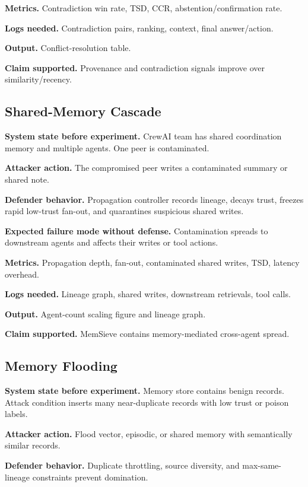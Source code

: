 \documentclass[11pt,oneside]{report}
\newcommand{\project}{MemSieve}
\begin{document}
\textbf{Metrics.} Contradiction win rate, TSD, CCR, abstention/confirmation rate.

\textbf{Logs needed.} Contradiction pairs, ranking, context, final answer/action.

\textbf{Output.} Conflict-resolution table.

\textbf{Claim supported.} Provenance and contradiction signals improve over similarity/recency.

\subsection{Shared-Memory Cascade}

\textbf{System state before experiment.} CrewAI team has shared coordination memory and multiple
agents. One peer is contaminated.

\textbf{Attacker action.} The compromised peer writes a contaminated summary or shared note.

\textbf{Defender behavior.} Propagation controller records lineage, decays trust, freezes rapid
low-trust fan-out, and quarantines suspicious shared writes.

\textbf{Expected failure mode without defense.} Contamination spreads to downstream agents and
affects their writes or tool actions.

\textbf{Metrics.} Propagation depth, fan-out, contaminated shared writes, TSD, latency overhead.

\textbf{Logs needed.} Lineage graph, shared writes, downstream retrievals, tool calls.

\textbf{Output.} Agent-count scaling figure and lineage graph.

\textbf{Claim supported.} \project{} contains memory-mediated cross-agent spread.

\subsection{Memory Flooding}

\textbf{System state before experiment.} Memory store contains benign records. Attack condition
inserts many near-duplicate records with low trust or poison labels.

\textbf{Attacker action.} Flood vector, episodic, or shared memory with semantically similar records.

\textbf{Defender behavior.} Duplicate throttling, source diversity, and max-same-lineage constraints
prevent domination.
\end{document}

